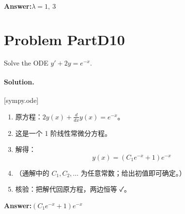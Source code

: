 \documentclass[11pt,a4paper]{ctexart}
\newcommand{\solvertag}[1]{{\footnotesize\color{gray}\textsf{[#1]}}}
\begin{document}
\noindent\textbf{Answer:}\quad $\lambda = 1,\ 3$

\medskip

\section*{Problem PartD10}
Solve the ODE $y' + 2y = e^{-x}$.

\paragraph{Solution.} \solvertag{sympy.ode} 

\begin{enumerate}[leftmargin=*]
  \item 原方程：$2 y{\left(x \right)} + \frac{d}{d x} y{\left(x \right)} = e^{- x}$。
  \item 这是一个 1 阶线性常微分方程。
  \item 解得：$$y{\left(x \right)} = \left(C_{1} e^{- x} + 1\right) e^{- x}$$
  \item （通解中的 $C_1, C_2, \dots$ 为任意常数；给出初值即可确定。）
  \item 核验：把解代回原方程，两边恒等 ✓。
\end{enumerate}

\noindent\textbf{Answer:}\quad $\left(C_{1} e^{- x} + 1\right) e^{- x}$

\medskip
\end{document}
